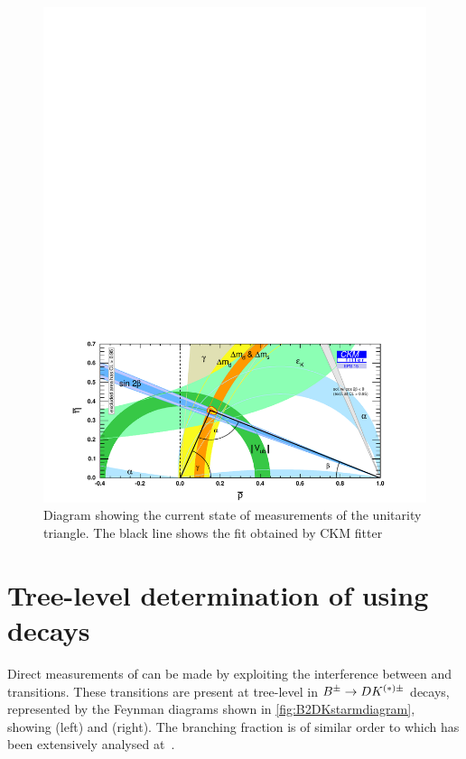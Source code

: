\begin{figure}[!ht]
\centering
\includegraphics[trim = 0mm 0mm 0mm 180mm,clip,width=0.9\linewidth]{figures/theory/rhoeta_small_global.pdf}
\caption{Diagram showing the current state of measurements of the unitarity triangle. The black line shows the fit obtained by CKM fitter}
\label{globalfit}
\end{figure}

\section{Tree-level determination of \Pgamma using  decays}
\label{sec:theory:gamma}

Direct measurements of \Pgamma can be made by exploiting the interference between \decay{\bquark}{\cquark\uquarkbar\squark} and \decay{\bquark}{\uquark\cquarkbar\squark} transitions. These transitions are present at tree-level in ${{B}^\pm} \rightarrow {\ensuremath{D}}{\ensuremath{K}}^{(*)\pm}$ decays, represented by the Feynman diagrams shown in \fig\ref{fig:B2DKstarmdiagram}, showing \decay{\Bm}{\Dz\Kstarm} (left) and \decay{\Bm}{\Dzb\Kstarm} (right). The branching
fraction is of similar order to \decay{\Bm}{\Dzb\Km} which has been extensively analysed at~\cite{LHCb-PAPER-2016-003,LHCb-PAPER-2014-041,LHCb-PAPER-2015-014}.


